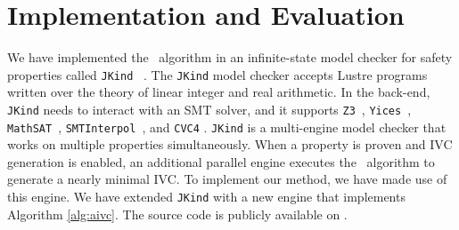 \section{Implementation and Evaluation}
\label{sec:impl}

We have implemented the \aivcalg ~algorithm 
in an infinite-state model checker for safety
properties called \texttt{JKind} ~\cite{jkind}. 
The \texttt{JKind} model checker accepts Lustre programs \cite{Halbwachs91:lustre}
written over the theory of linear integer and real arithmetic. In the
back-end, \texttt{JKind} needs to interact with an SMT solver, and
it supports \texttt{Z3}~\cite{DeMoura08:z3},
\texttt{Yices}~\cite{Dutertre06:yices}, \texttt{MathSAT}~\cite{Cimatti2013:MathSAT},
\texttt{SMTInterpol}~\cite{Christ2012:SMTInterpol}, and \texttt{CVC4} \cite{barrett2011cvc4}. \texttt{JKind} is a multi-engine model checker that works on multiple properties simultaneously. When a property is
proven and IVC generation is enabled, an additional parallel engine
executes the \ucalg ~algorithm \cite{Ghass16} to generate a nearly minimal IVC. To implement our method, we have made use of this engine. We have extended \texttt{JKind} with a new engine that
implements Algorithm \ref{alg:aivc}.
The source code is publicly available on \cite{mygit}.

%
 

